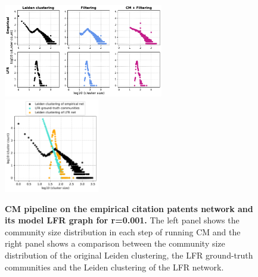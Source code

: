 \documentclass[a4paper]{article}   	%
\begin{document}
\begin{figure}[h!]
\centering
\includegraphics[width=0.62\textwidth]{figs/cit_patents_cm_steps_lfr001.pdf}
\includegraphics[width=0.37\textwidth]{figs/cit_patents_001_cm_size.pdf}
\caption[CM pipeline on the empirical citation patents network and its model LFR graph for r=0.001]{\textbf{CM pipeline on the empirical citation patents network and its model LFR graph for r=0.001.} The left panel shows the community size distribution in each step of running CM and the right panel shows a comparison between the community size distribution of the original Leiden clustering, the LFR ground-truth communities and the Leiden clustering of the LFR network.}
\label{fig:patents-cm-lfr-001}
\end{figure}
\end{document}
